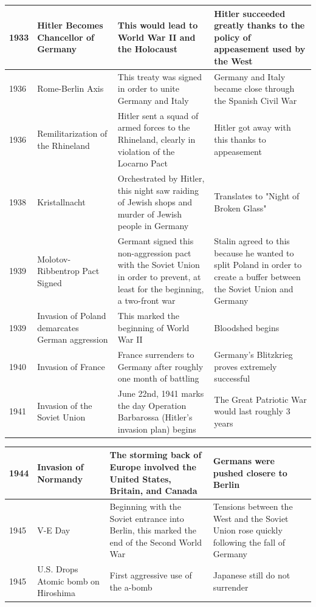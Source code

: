 \documentclass[12pt]{article}
\begin{document}
\begin{enumerate}
\begin{tabular}{|p{}|p{}|p{}|p{}|}
\hline
1933 & Hitler Becomes Chancellor of Germany & This would lead to World War II and the Holocaust  & Hitler succeeded greatly thanks to the policy of appeasement used by the West  \\
\hline
1936 & Rome-Berlin Axis  & This treaty was signed in order to unite Germany and Italy  & Germany and Italy became close through the Spanish Civil War  \\
\hline
1936 & Remilitarization of the Rhineland  & Hitler sent a squad of armed forces to the Rhineland, clearly in violation of the Locarno Pact  & Hitler got away with this thanks to appeasement  \\
\hline
1938 & Kristallnacht & Orchestrated by Hitler, this night saw raiding of Jewish shops and murder of Jewish people in Germany & Translates to "Night of Broken Glass" \\
\hline
1939 & Molotov-Ribbentrop Pact Signed  & Germant signed this non-aggression pact with the Soviet Union in order to prevent, at least for the beginning, a two-front war  & Stalin agreed to this because he wanted to split Poland in order to create a buffer between the Soviet Union and Germany  \\
\hline
1939 & Invasion of Poland demarcates German aggression & This marked the beginning of World War II & Bloodshed begins \\
\hline 
1940 & Invasion of France & France surrenders to Germany after roughly one month of battling & Germany's Blitzkrieg proves extremely successful \\
\hline
1941 & Invasion of the Soviet Union & June 22nd, 1941 marks the day Operation Barbarossa (Hitler's invasion plan) begins & The Great Patriotic War would last roughly 3 years \\
\hline
\end{tabular}
\newpage
\hspace{-25pt}\begin{tabular}{|p{}|p{}|p{}|p{}|}
\hline
1944 & Invasion of Normandy & The storming back of Europe involved the United States, Britain, and Canada & Germans were pushed closere to Berlin  \\
\hline
1945 & V-E Day  & Beginning with the Soviet entrance into Berlin, this marked the end of the Second World War  & Tensions between the West and the Soviet Union rose quickly following the fall of Germany  \\
\hline
1945 & U.S. Drops Atomic bomb on Hiroshima  & First aggressive use of the a-bomb & Japanese still do not surrender \\

\end{tabular}
\end{enumerate}
\end{document}
